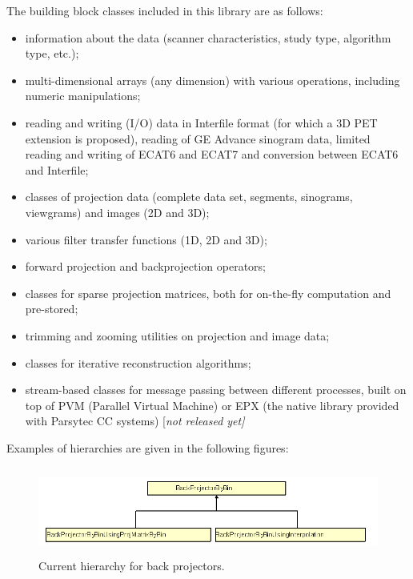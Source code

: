 \documentclass{article}
\begin{document}
The building block classes included in this library are as follows:

\begin{itemize}
\item information about the data (scanner characteristics, study type, 
algorithm type, etc.);
\item multi-dimensional arrays (any dimension) with various 
operations, including numeric manipulations;
\item reading and writing (I/O) data in Interfile format (for 
which a 3D PET extension is proposed), reading of GE Advance 
sinogram data, limited reading and writing of ECAT6 and ECAT7 
and conversion between ECAT6 and Interfile;
\item classes of projection data (complete data set, segments, 
sinograms, viewgrams) and images (2D and 3D);
\item various filter transfer functions (1D, 2D and 3D);
\item forward projection and backprojection operators;
\item classes for sparse projection matrices, both for on-the-fly 
computation and pre-stored;
\item trimming and zooming utilities on projection and image 
data;
\item classes for iterative reconstruction algorithms;
\item stream-based classes for message passing between different 
processes, built on top of PVM (Parallel Virtual Machine) or 
EPX (the native library provided with Parsytec CC systems) [\textit{not 
released yet]}
\end{itemize}

Examples of hierarchies are given in the following figures:
\begin{figure}[htbp]
\begin{center}
\includegraphics[width=5.667in, height=1.137in]{graphics/STIR-general-overviewFig1}
\caption{Current hierarchy for back projectors.}
\end{center}
\end{figure}
\end{document}
